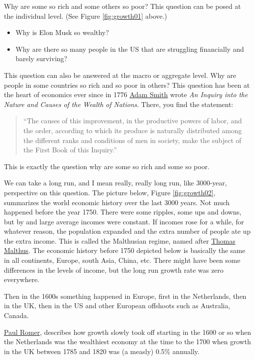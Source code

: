 \documentclass[
]{book}
\providecommand{\tightlist}{%
  \setlength{\itemsep}{0pt}\setlength{\parskip}{0pt}}
\begin{document}
Why are some so rich and some others so poor? This question can be posed at the individual level. (See Figure \ref{fig:growth01} above.)

\begin{itemize}
\tightlist
\item
  Why is Elon Musk so wealthy?
\item
  Why are there so many people in the US that are struggling financially and barely surviving?
\end{itemize}

This question can also be answered at the macro or aggregate level. Why are people in some countries so rich and so poor in others? This question has been at the heart of economics ever since in 1776 \href{https://en.wikipedia.org/wiki/Adam_Smith}{Adam Smith} wrote \emph{An Inquiry into the Nature and Causes of the Wealth of Nations}. There, you find the statement:

\begin{quote}
``The causes of this improvement, in the productive powers of labor, and the order, according to which its produce is naturally distributed among the different ranks and conditions of men in society, make the subject of the First Book of this Inquiry.''
\end{quote}

This is exactly the question why are some so rich and some so poor.

We can take a long run, and I mean really, really long run, like 3000-year, perspective on this question. The picture below, Figure \ref{fig:growth02}, summarizes the world economic history over the last 3000 years. Not much happened before the year 1750. There were some ripples, some ups and downs, but by and large average incomes were constant. If incomes rose for a while, for whatever reason, the population expanded and the extra number of people ate up the extra income. This is called the Malthusian regime, named after \href{https://en.wikipedia.org/wiki/Thomas_Robert_Malthus}{Thomas Malthus}. The economic history before 1750 depicted below is basically the same in all continents, Europe, south Asia, China, etc. There might have been some differences in the levels of income, but the long run growth rate was zero everywhere.

Then in the 1600s something happened in Europe, first in the Netherlands, then in the UK, then in the US and other European offshoots such as Australia, Canada.

\href{https://en.wikipedia.org/wiki/Paul_Romer}{Paul Romer}, describes how growth slowly took off starting in the 1600 or so when the Netherlands was the wealthiest economy at the time to the 1700 when growth in the UK between 1785 and 1820 was (a measly) 0.5\% annually.
\end{document}
